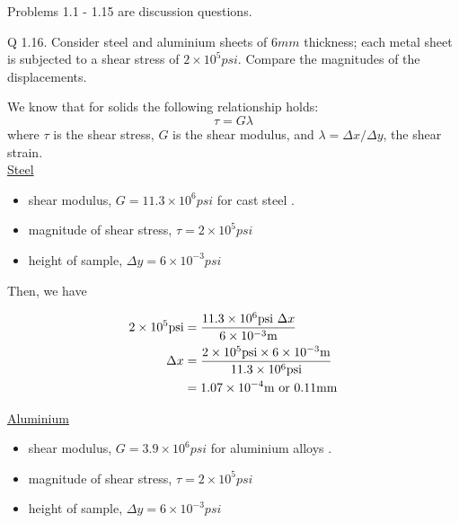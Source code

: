Problems 1.1 - 1.15 are discussion questions.

\begin{question}
  Q 1.16. Consider steel and aluminium sheets of $6\si{mm}$ thickness; each metal sheet is subjected to a shear stress of $2 \times 10^{5} \si{psi}$. Compare the magnitudes of the displacements.
\end{question}

\begin{solution}
  We know that for solids the following relationship holds:
  \begin{equation}\label{eq:shear-solids}
    \tau = G \lambda
  \end{equation}
  where $\tau$ is the shear stress, $G$ is the shear modulus, and $\lambda = \Delta x / \Delta y$, the shear strain.
  \\

  \noindent \underline{Steel}
  \begin{itemize}
    \item shear modulus, $G = 11.3 \times 10^6 \si{psi}$ for cast steel \parencite{engineering03shearmodulus}.
    \item magnitude of shear stress, $\tau = 2 \times 10^5 \si{psi}$
    \item height of sample, $ \Delta y = 6 \times 10^{-3} \si{psi}$
  \end{itemize}

  Then, we have

  \begin{align*}
    2 \times 10^5 \si{psi} &= \frac{ 11.3 \times 10^6 \si{psi} ~ \Delta x }{ 6 \times 10^{-3} \si{m} } \\
    \Delta x &= \frac{ 2 \times 10^{5} \si{psi} \times 6 \x 10^{-3} \si{m} }{ 11.3 \times 10^{6} \si{psi} } \\
    &= 1.07 \x 10^{-4} \si{m} \text{ or } 0.11 \si{mm}
  \end{align*}

  \noindent \underline{Aluminium}
  \begin{itemize}
    \item shear modulus, $G = 3.9 \times 10^6 \si{psi}$ for aluminium alloys \parencite{engineering03shearmodulus}.
    \item magnitude of shear stress, $\tau = 2 \times 10^5 \si{psi}$
    \item height of sample, $ \Delta y = 6 \times 10^{-3} \si{psi}$
  \end{itemize}


\end{solution}
